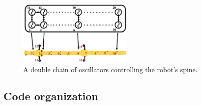 \documentclass{cmc}
\begin{document}
\begin{figure}[h]
  \centering
  \includegraphics[width=0.5\textwidth]{figures/model_controller.png}
  \caption[Controller model]{A double chain of oscillators controlling the
    robot’s spine.}
  \label{fig:controller-model}
\end{figure}


\subsection*{Code organization}
\label{subsec:code}
\end{document}
